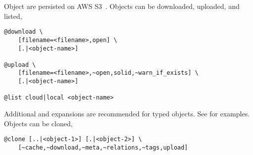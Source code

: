 Object are persisted on AWS S3~\cite{aws_s3}. Objects can be downloaded, uploaded, and listed,
%
\begin{verbatim}
@download \
    [filename=<filename>,open] \
    [.|<object-name>]

@upload \
    [filename=<filename>,~open,solid,~warn_if_exists] \
    [.|<object-name>]
    
@list cloud|local <object-name>
\end{verbatim}
%
Additional  and  expansions are recommended for typed objects. See  for examples. Objects can be cloned,
%
\begin{verbatim}
@clone [..|<object-1>] [.|<object-2>] \
    [~cache,~download,~meta,~relations,~tags,upload]
\end{verbatim}